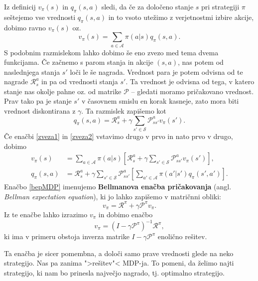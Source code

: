 \documentclass[12pt,a4paper]{amsart}
\theoremstyle{definition} %
\theoremstyle{plain} %
\begin{document}
Iz definicij $v_\pi(s)$ in $q_\pi(s, a)$ sledi, da če za določeno stanje $s$ pri strategiji $\pi$ 
seštejemo vse vrednosti $q_\pi(s, a)$ in to vsoto utežimo z verjetnostmi izbire akcije, dobimo ravno 
$v_\pi(s)$ oz. 
\begin{equation}\label{zveza1}
    v_\pi(s) = \sum_{a \in \mathcal{A}} \pi(a|s)q_\pi(s, a).
\end{equation}
S podobnim razmislekom lahko dobimo še eno zvezo med tema dvema funkcijama. Če začnemo s parom stanja 
in akcije $(s, a)$, nas potem od naslednjega stanja $s'$ loči le še nagrada. Vrednost para je potem 
odvisna od te nagrade $\mathcal{R}_s^a$ in pa od vrednosti stanja $s'$. Ta vrednost je odvisna od tega, 
v katero stanje nas okolje pahne oz. od matrike $\mathcal{P}$ -- gledati moramo pričakovano vrednost. 
Prav tako pa je stanje $s'$ v časovnem smislu en korak kasneje, zato mora biti vrednost diskontirana z 
$\gamma$. Ta razmislek zapišemo kot
\begin{equation}\label{zveza2}
    q_\pi(s, a) = \mathcal{R}_s^a + \gamma \sum_{s' \in \mathcal{S}} \mathcal{P}_{ss'}^a v_\pi(s').
\end{equation}
Če enačbi \eqref{zveza1} in \eqref{zveza2} vstavimo drugo v prvo in nato prvo v drugo, dobimo
\begin{align}
    v_\pi(s) &= \sum_{a \in \mathcal{A}} \pi(a|s) \left[\mathcal{R}_s^a + 
    \gamma \sum_{s' \in \mathcal{S}} \mathcal{P}_{ss'}^a v_\pi(s') \right], \label{bepMDP} \\
    q_\pi(s, a) &= \mathcal{R}_s^a + \gamma \sum_{s' \in \mathcal{S}} 
    \mathcal{P}_{ss'}^a \left[\sum_{a' \in \mathcal{A}} \pi(a'|s')q_\pi(s', a') \right].
\end{align}
Enačbo \eqref{bepMDP} imenujemo \textbf{Bellmanova enačba pričakovanja} (angl. \textit{Bellman 
expectation equation}), ki jo lahko zapišemo v matričnni obliki:
$$
v_\pi = \mathcal{R}^\pi + \gamma \mathcal{P}^\pi v_\pi.
$$
Iz te enačbe lahko izrazimo $v_\pi$ in dobimo enačbo
$$
v_\pi = (I - \gamma \mathcal{P}^\pi)^{-1} \mathcal{R}^\pi,
$$
ki ima v primeru obstoja inverza matrike $I - \gamma \mathcal{P}^\pi$ enolično rešitev.

Ta enačba je sicer pomembna, a določi samo prave vrednosti glede na neko strategijo. Nas pa zanima 
">rešitev"< MDP-ja. To pomeni, da želimo najti strategijo, ki nam bo prinesla največjo nagrado, tj. 
optimalno strategijo.
\end{document}
